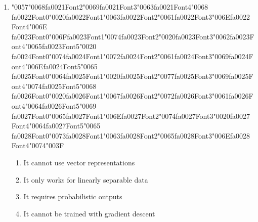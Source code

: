 \documentclass[12pt]{article}
\begin{document}
\begin{enumerate}[label=Q\arabic*.]
\item {\char"0057}{\char"0068}{\csname fa0021Font2\endcsname\char"0069}{\csname fa0021Font3\endcsname\char"0063}{\csname fa0021Font4\endcsname\char"0068} {\csname fa0022Font0\endcsname\char"0020}{\csname fa0022Font1\endcsname\char"0063}{\csname fa0022Font2\endcsname\char"0061}{\csname fa0022Font3\endcsname\char"006E}{\csname fa0022Font4\endcsname\char"006E} {\csname fa0023Font0\endcsname\char"006F}{\csname fa0023Font1\endcsname\char"0074}{\csname fa0023Font2\endcsname\char"0020}{\csname fa0023Font3\endcsname\char"0062}{\csname fa0023Font4\endcsname\char"0065}{\csname fa0023Font5\endcsname\char"0020} {\csname fa0024Font0\endcsname\char"0074}{\csname fa0024Font1\endcsname\char"0072}{\csname fa0024Font2\endcsname\char"0061}{\csname fa0024Font3\endcsname\char"0069}{\csname fa0024Font4\endcsname\char"006E}{\csname fa0024Font5\endcsname\char"0065} {\csname fa0025Font0\endcsname\char"0064}{\csname fa0025Font1\endcsname\char"0020}{\csname fa0025Font2\endcsname\char"0077}{\csname fa0025Font3\endcsname\char"0069}{\csname fa0025Font4\endcsname\char"0074}{\csname fa0025Font5\endcsname\char"0068} {\csname fa0026Font0\endcsname\char"0020}{\csname fa0026Font1\endcsname\char"0067}{\csname fa0026Font2\endcsname\char"0072}{\csname fa0026Font3\endcsname\char"0061}{\csname fa0026Font4\endcsname\char"0064}{\csname fa0026Font5\endcsname\char"0069} {\csname fa0027Font0\endcsname\char"0065}{\csname fa0027Font1\endcsname\char"006E}{\csname fa0027Font2\endcsname\char"0074}{\csname fa0027Font3\endcsname\char"0020}{\csname fa0027Font4\endcsname\char"0064}{\csname fa0027Font5\endcsname\char"0065} {\csname fa0028Font0\endcsname\char"0073}{\csname fa0028Font1\endcsname\char"0063}{\csname fa0028Font2\endcsname\char"0065}{\csname fa0028Font3\endcsname\char"006E}{\csname fa0028Font4\endcsname\char"0074}{\char"003F}
\begin{enumerate}[label=(\Alph*)]
    \item It cannot use vector representations
    \item It only works for linearly separable data
    \item It requires probabilistic outputs
    \item It cannot be trained with gradient descent
\end{enumerate}

\end{enumerate}
\end{document}
